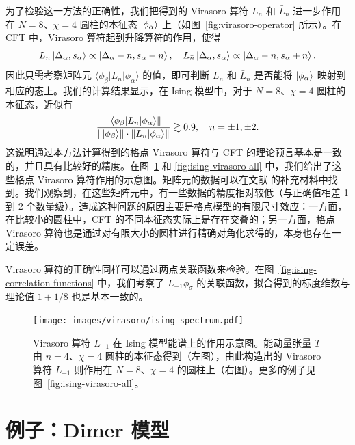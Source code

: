 为了检验这一方法的正确性，我们把得到的 Virasoro 算符 $L_n$ 和 $\bar{L}_n$ 进一步作用在 $N=8$、$\chi=4$ 圆柱的本征态 $\ket*{\phi_\alpha}$ 上（如图~\ref{fig:virasoro-operator} 所示）。在 CFT 中，Virasoro 算符起到升降算符的作用，使得
\begin{equation}
  L_n         \ket{\Delta_\alpha, s_\alpha} \propto \ket{\Delta_\alpha-n, s_\alpha-n}, \quad
  L_{\bar{n}} \ket{\Delta_\alpha, s_\alpha} \propto \ket{\Delta_\alpha-n, s_\alpha+n}.
\end{equation}
因此只需考察矩阵元 $\langle\phi_\beta|L_n|\phi_\alpha\rangle$ 的值，即可判断 $L_n$ 和 $\bar{L}_n$ 是否能将 $\ket*{\phi_\alpha}$ 映射到相应的态上。我们的计算结果显示，在 Ising 模型中，对于 $N=8$、$\chi=4$ 圆柱的本征态，近似有
\begin{equation}
  \frac{\lVert \langle\phi_\beta|L_n|\phi_\alpha\rangle \rVert}{\lVert \ket*{\phi_\beta} \rVert \cdot \lVert L_n\ket*{\phi_\alpha} \rVert} \gtrsim 0.9, \quad
  n=\pm1, \pm2.
\end{equation}
这说明通过本方法计算得到的格点 Virasoro 算符与 CFT 的理论预言基本是一致的，并且具有比较好的精度。在图~\ref{fig:ising-virasoro} 和 \ref{fig:ising-virasoro-all} 中，我们给出了这些格点 Virasoro 算符作用的示意图。矩阵元的数据可以在文献 \parencite{wang2022virasoro} 的补充材料中找到。我们观察到，在这些矩阵元中，有一些数据的精度相对较低（与正确值相差 1 到 2 个数量级）。造成这种问题的原因主要是格点模型的有限尺寸效应：一方面，在比较小的圆柱中，CFT 的不同本征态实际上是存在交叠的；另一方面，格点 Virasoro 算符也是通过对有限大小的圆柱进行精确对角化求得的，本身也存在一定误差。

Virasoro 算符的正确性同样可以通过两点关联函数来检验。在图~\ref{fig:ising-correlation-functions} 中，我们考察了 $L_{-1}\phi_\sigma$ 的关联函数，拟合得到的标度维数与理论值 $1+1/8$ 也是基本一致的。

\begin{figure}[ht]
  \centering
  \texttt{[image: images/virasoro/ising\_spectrum.pdf]}
  \caption[Virasoro 算符在 Ising 模型能谱上的作用示意图]{Virasoro 算符 $L_{-1}$ 在 Ising 模型能谱上的作用示意图。能动量张量 $T$ 由 $n=4$、$\chi=4$ 圆柱的本征态得到（左图），由此构造出的 Virasoro 算符 $L_{-1}$ 则作用在 $N=8$、$\chi=4$ 的圆柱上（右图）。更多的例子见图~\ref{fig:ising-virasoro-all}。}
  \label{fig:ising-virasoro}
\end{figure}

\section{例子：Dimer 模型}


